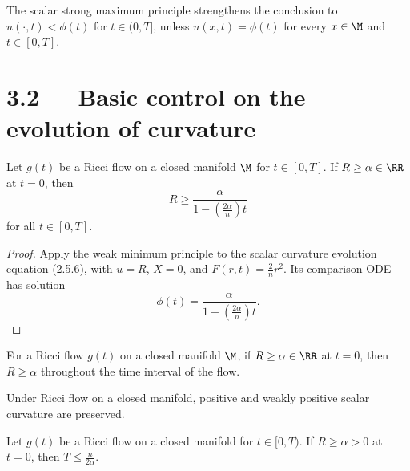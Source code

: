 \begin{remark}
\label{topping-maxpr-strong-maximum-principle}

The scalar strong maximum principle strengthens the conclusion to
$u(\cdot,t)<\phi(t)$ for $t\in(0,T]$, unless
$u(x,t)=\phi(t)$ for every $x\in\M$ and $t\in[0,T]$.
\end{remark}

\section*{3.2\ \ \ Basic control on the evolution of curvature}

\begin{theorem}
\label{topping-maxpr-scalar-lower-bound}


Let $g(t)$ be a Ricci flow on a closed manifold $\M$ for $t\in[0,T]$. If
$R\geq\alpha\in\RR$ at $t=0$, then
\[
R\geq\frac{\alpha}{1-\left(\frac{2\alpha}{n}\right)t}
\]
for all $t\in[0,T]$.
\end{theorem}

\begin{proof}
\sketch Apply the weak minimum principle to the scalar curvature evolution
equation (2.5.6), with $u=R$, $X=0$, and $F(r,t)=\frac{2}{n}r^2$. Its
comparison ODE has solution
\[
\phi(t)=\frac{\alpha}{1-\left(\frac{2\alpha}{n}\right)t}.
\]
\end{proof}

\begin{corollary}
\label{topping-maxpr-scalar-preserved}

For a Ricci flow $g(t)$ on a closed manifold $\M$, if $R\geq\alpha\in\RR$ at
$t=0$, then $R\geq\alpha$ throughout the time interval of the flow.
\end{corollary}

\begin{corollary}
\label{topping-maxpr-positive-scalar-preserved}

Under Ricci flow on a closed manifold, positive and weakly positive scalar
curvature are preserved.
\end{corollary}

\begin{corollary}
\label{topping-maxpr-finite-time-blowup}

Let $g(t)$ be a Ricci flow on a closed manifold for $t\in[0,T)$. If
$R\geq\alpha>0$ at $t=0$, then $T\leq\frac{n}{2\alpha}$.
\end{corollary}

